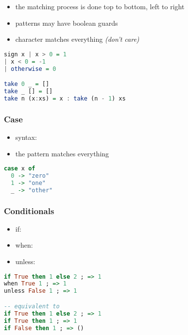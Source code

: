 \documentclass[a4paper,landscape,10pt]{article}
\begin{document}
\begin{multicols*}{2}
  \begin{itemize}
    \item the matching process is done top to bottom, left to right
    \item patterns may have boolean guards
    \item character \ihaskell{_} matches everything \textit{(don't care)}
  \end{itemize}

  \begin{lstlisting}[language=Haskell]
sign x | x > 0 = 1
| x < 0 = -1
| otherwise = 0

take 0 _ = []
take _ [] = []
take n (x:xs) = x : take (n - 1) xs
\end{lstlisting}

  \subsubsection{Case}

  \begin{itemize}
    \item syntax: 
    \item the \ihaskell{_} pattern matches everything
  \end{itemize}

  \begin{lstlisting}[language=Haskell]
case x of
  0 -> "zero"
  1 -> "one"
  _ -> "other"
\end{lstlisting}

  \subsubsection{Conditionals}

  \begin{itemize}
    \item if: 
    \item when: 
    \item unless: 
  \end{itemize}

  \begin{lstlisting}[language=Haskell]
if True then 1 else 2 ; => 1
when True 1 ; => 1
unless False 1 ; => 1

-- equivalent to
if True then 1 else 2 ; => 1
if True then 1 ; => 1
if False then 1 ; => ()


\end{lstlisting}
\end{multicols*}
\end{document}
